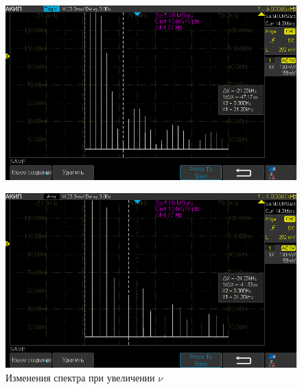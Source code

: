 \documentclass[12pt,a4paper]{article}
\begin{document}
\begin{figure}[H]
	\centering
	\begin{minipage}[b]{.5\textwidth}
		\centering
		\includegraphics[width=0.9\linewidth]{"photo/impulse3"}
		\label{photo:impulse_nu}
		\caption{Изменения спектра при увеличении $\nu$}
	\end{minipage}%
	\begin{minipage}[b]{.5\textwidth}
		\centering
		\includegraphics[width=0.9\linewidth]{"photo/impulse4"}
	\end{minipage}
\end{figure}
\end{document}
